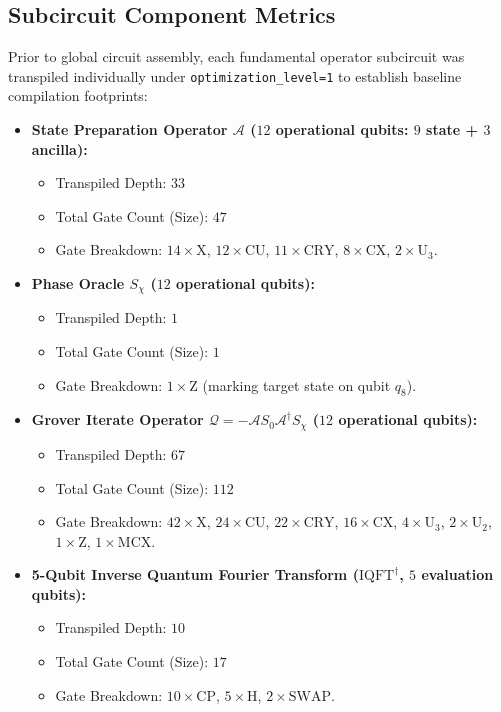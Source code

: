 \subsection{Subcircuit Component Metrics}
Prior to global circuit assembly, each fundamental operator subcircuit was transpiled individually under \texttt{optimization\_level=1} to establish baseline compilation footprints:
\begin{itemize}[leftmargin=*]
    \item \textbf{State Preparation Operator $\mathcal{A}$ ($12$ operational qubits: $9$ state + $3$ ancilla):}
    \begin{itemize}
        \item Transpiled Depth: $33$
        \item Total Gate Count (Size): $47$
        \item Gate Breakdown: $14\times\mathrm{X}$, $12\times\mathrm{CU}$, $11\times\mathrm{CRY}$, $8\times\mathrm{CX}$, $2\times\mathrm{U}_3$.
    \end{itemize}
    \item \textbf{Phase Oracle $S_\chi$ ($12$ operational qubits):}
    \begin{itemize}
        \item Transpiled Depth: $1$
        \item Total Gate Count (Size): $1$
        \item Gate Breakdown: $1\times\mathrm{Z}$ (marking target state on qubit $q_8$).
    \end{itemize}
    \item \textbf{Grover Iterate Operator $\mathcal{Q} = -\mathcal{A} S_0 \mathcal{A}^\dagger S_\chi$ ($12$ operational qubits):}
    \begin{itemize}
        \item Transpiled Depth: $67$
        \item Total Gate Count (Size): $112$
        \item Gate Breakdown: $42\times\mathrm{X}$, $24\times\mathrm{CU}$, $22\times\mathrm{CRY}$, $16\times\mathrm{CX}$, $4\times\mathrm{U}_3$, $2\times\mathrm{U}_2$, $1\times\mathrm{Z}$, $1\times\mathrm{MCX}$.
    \end{itemize}
    \item \textbf{5-Qubit Inverse Quantum Fourier Transform ($\mathrm{IQFT}^\dagger$, $5$ evaluation qubits):}
    \begin{itemize}
        \item Transpiled Depth: $10$
        \item Total Gate Count (Size): $17$
        \item Gate Breakdown: $10\times\mathrm{CP}$, $5\times\mathrm{H}$, $2\times\mathrm{SWAP}$.
    \end{itemize}
\end{itemize}


